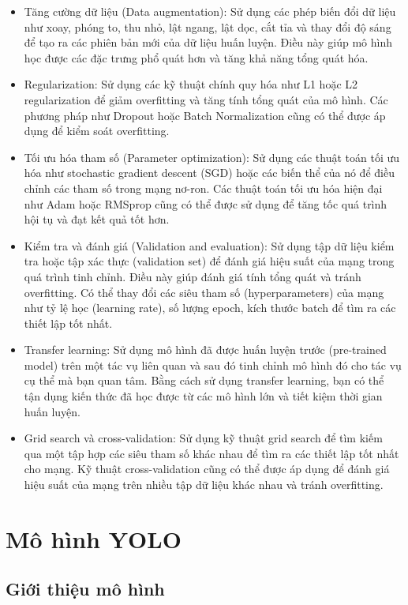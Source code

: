 \begin{itemize}
    \item Tăng cường dữ liệu (Data augmentation): Sử dụng các phép biến đổi dữ liệu như xoay, phóng to, thu nhỏ, lật ngang, lật dọc, cắt tỉa và thay đổi độ sáng để tạo ra các phiên bản mới của dữ liệu huấn luyện. Điều này giúp mô hình học được các đặc trưng phổ quát hơn và tăng khả năng tổng quát hóa.
    \item Regularization: Sử dụng các kỹ thuật chính quy hóa như L1 hoặc L2 regularization để giảm overfitting và tăng tính tổng quát của mô hình. Các phương pháp như Dropout hoặc Batch Normalization cũng có thể được áp dụng để kiểm soát overfitting.
    \item Tối ưu hóa tham số (Parameter optimization): Sử dụng các thuật toán tối ưu hóa như stochastic gradient descent (SGD) hoặc các biến thể của nó để điều chỉnh các tham số trong mạng nơ-ron. Các thuật toán tối ưu hóa hiện đại như Adam hoặc RMSprop cũng có thể được sử dụng để tăng tốc quá trình hội tụ và đạt kết quả tốt hơn.
    \item Kiểm tra và đánh giá (Validation and evaluation): Sử dụng tập dữ liệu kiểm tra hoặc tập xác thực (validation set) để đánh giá hiệu suất của mạng trong quá trình tinh chỉnh. Điều này giúp đánh giá tính tổng quát và tránh overfitting. Có thể thay đổi các siêu tham số (hyperparameters) của mạng như tỷ lệ học (learning rate), số lượng epoch, kích thước batch để tìm ra các thiết lập tốt nhất.
    \item Transfer learning: Sử dụng mô hình đã được huấn luyện trước (pre-trained model) trên một tác vụ liên quan và sau đó tinh chỉnh mô hình đó cho tác vụ cụ thể mà bạn quan tâm. Bằng cách sử dụng transfer learning, bạn có thể tận dụng kiến thức đã học được từ các mô hình lớn và tiết kiệm thời gian huấn luyện.
    \item Grid search và cross-validation: Sử dụng kỹ thuật grid search để tìm kiếm qua một tập hợp các siêu tham số khác nhau để tìm ra các thiết lập tốt nhất cho mạng. Kỹ thuật cross-validation cũng có thể được áp dụng để đánh giá hiệu suất của mạng trên nhiều tập dữ liệu khác nhau và tránh overfitting.
\end{itemize}


\section{Mô hình YOLO}

\subsection{Giới thiệu mô hình}

